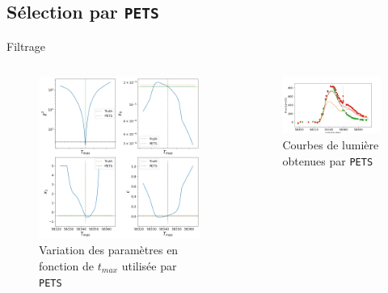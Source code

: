 \documentclass{beamer}
\begin{document}
\subsection{Sélection par \texttt{PETS}}

\begin{frame}{Filtrage}
\begin{columns}
\begin{column}{.5\textwidth}
\begin{figure}
	\centering
	\includegraphics[width=.9\textwidth]{figures/26_pets_old.png}
	\caption{Variation des paramètres en fonction de $t_{max}$ utilisée par \texttt{PETS}}
\end{figure}
\end{column}

\begin{column}{.5\textwidth}
\begin{figure}
	\centering
	\includegraphics[width=.9\textwidth]{figures/26_lc_pets.png}
	\caption{Courbes de lumière obtenues par \texttt{PETS}}
\end{figure}
\end{column}
\end{columns}
\end{frame}
\end{document}
